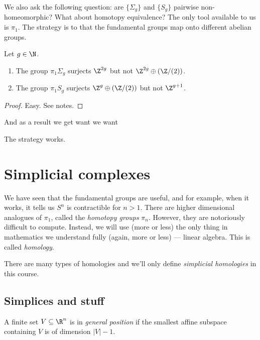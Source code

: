 \documentclass[a4paper]{article}
\begin{document}
We also ask the following question: are \(\{\Sigma_g\}\) and \(\{S_g\}\) pairwise non-homeomorphic? What about homotopy equivalence? The only tool available to us is \(\pi_1\). The strategy is to that the fundamental groups map onto different abelian groups. %

\begin{lemma}
  Let \(g \in \N\).
  \begin{enumerate}
  \item The group \(\pi_1 \Sigma_g\) surjects \(\Z^{2g}\) but not \(\Z^{2g} \oplus (\Z/(2))\).
  \item The group \(\pi_1 S_g\) surjects \(\Z^g \oplus (\Z/(2))\) but not \(\Z^{g + 1}\).
  \end{enumerate}
\end{lemma}

\begin{proof}
  Easy. See notes.
\end{proof}

And as a result we get want we want

\begin{corollary}
  The strategy works.
\end{corollary}

\section{Simplicial complexes}

We have seen that the fundamental groups are useful, and for example, when it works, it tells us \(S^n\) is contractible for \(n > 1\). There are higher dimensional analogues of \(\pi_1\), called the \emph{homotopy groups} \(\pi_n\). However, they are notoriously difficult to compute. Instead, we will use (more or less) the only thing in mathematics we understand fully (again, more or less) --- linear algebra. This is called \emph{homology}.

There are many types of homologies and we'll only define \emph{simplicial homologies} in this course.

\subsection{Simplices and stuff}

\begin{definition}
  A finite set \(V \subseteq \R^n\) is in \emph{general position} if the smallest affine subspace containing \(V\) is of dimension \(|V| - 1\).
\end{definition}
\end{document}
